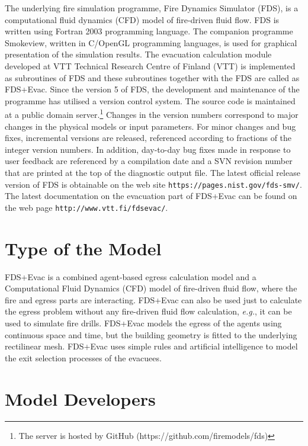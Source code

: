 \documentclass[12pt,a4paper,final,twoside]{stylevk}
\begin{document}
\noindent The underlying fire simulation programme, Fire Dynamics
Simulator (FDS), is a computational fluid dynamics (CFD) model of
fire-driven fluid flow.  FDS is written using Fortran 2003 programming
language.  The companion programme Smokeview, written in C/OpenGL
programming languages, is used for graphical presentation of the
simulation results.  The evacuation calculation module developed at
VTT Technical Research Centre of Finland (VTT) is implemented as
subroutines of FDS and these subroutines together with the FDS are
called as FDS+Evac.  Since the version 5 of FDS, the development and
maintenance of the programme has utilised a version control system.
The source code is maintained at a public domain server.\footnote{The
  server is hosted by GitHub (https://github.com/firemodels/fds)}
Changes in the version numbers correspond to major changes in the
physical models or input parameters.  For minor changes and bug fixes,
incremental versions are released, referenced according to fractions
of the integer version numbers.  In addition, day-to-day bug fixes
made in response to user feedback are referenced by a compilation date
and a SVN revision number that are printed at the top of the
diagnostic output file.  The latest official release version of FDS is
obtainable on the web site {\tt https://pages.nist.gov/fds-smv/}.  The
latest documentation on the evacuation part of FDS+Evac can be found
on the web page {\tt http://www.vtt.fi/fdsevac/}.


\section{Type of the Model}

\noindent FDS+Evac is a combined agent-based egress calculation model
and a Computational Fluid Dynamics (CFD) model of fire-driven fluid
flow, where the fire and egress parts are interacting.  FDS+Evac can
also be used just to calculate the egress problem without any
fire-driven fluid flow calculation, \emph{e.g.}, it can be used to
simulate fire drills.  FDS+Evac models the egress of the agents using
continuous space and time, but the building geometry is fitted to the
underlying rectilinear mesh.  FDS+Evac uses simple rules and
artificial intelligence to model the exit selection processes of the
evacuees.


\section{Model Developers}
\end{document}
